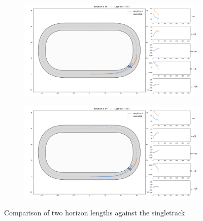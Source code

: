 \documentclass[a4paper, onecolumn, 12pt]{article}
\begin{document}
\begin{figure}[H] 
    \centering
        \begin{subfigure}{\textwidth} \label{horizon_shorter}
        \centering
        \includegraphics[width=\textwidth]{assets/horizon_shorter.png}
    \end{subfigure}
    \begin{subfigure}{\textwidth}
        \centering
        \includegraphics[width=\textwidth]{assets/horizon_longer.png}
    \end{subfigure}
    \caption[short]{Comparison of two horizon lengths against the singletrack}
\end{figure}
\end{document}
